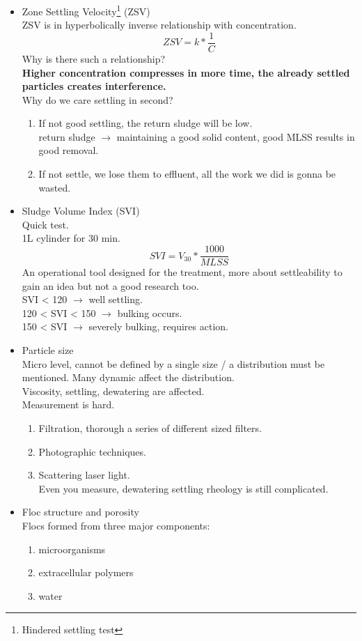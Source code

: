 \documentclass[12pt]{article}
\begin{document}
    \begin{itemize}
        \item Zone Settling Velocity\footnote{Hindered settling test} (ZSV)\\
        ZSV is in hyperbolically inverse relationship with concentration.
        \[ZSV = k * \frac{1}{C}\]
        Why is there such a relationship?\\
        \textbf{Higher concentration compresses in more time, the already settled particles creates interference.}\\
        Why do we care settling in second?
        \begin{enumerate}
            \item If not good settling, the return sludge will be low.\\
            return sludge $\rightarrow$ maintaining a good solid content, good MLSS results in good removal.
            \item If not settle, we lose them to effluent, all the work we did is gonna be wasted.
        \end{enumerate}
        \item Sludge Volume Index (SVI)\\
        Quick test.\\
        1L cylinder for 30 min.
        \[SVI = V_{30} * \frac{1000}{MLSS}\]
        An operational tool designed for the  treatment, more about settleability to gain an idea but not a good research too.\\
        SVI < 120 $\rightarrow$ well settling.\\
        120 < SVI < 150 $\rightarrow$ bulking occurs.\\
        150 < SVI $\rightarrow$ severely bulking, requires action.
        \item Particle size\\
        Micro level, cannot be defined by a single size / a distribution must be mentioned.
        Many dynamic affect the distribution.\\
        Viscosity, settling, dewatering are affected.\\
        Measurement is hard.
        \begin{enumerate}
            \item Filtration, thorough a series of different sized filters.
            \item Photographic techniques.
            \item Scattering laser light.\\
            Even you measure, dewatering settling rheology is still complicated.
        \end{enumerate}
        \item Floc structure and porosity\\
        Flocs formed from three major components:
        \begin{enumerate}
            \item microorganisms
            \item extracellular polymers
            \item water
        \end{enumerate}
    \end{itemize}
\end{document}
